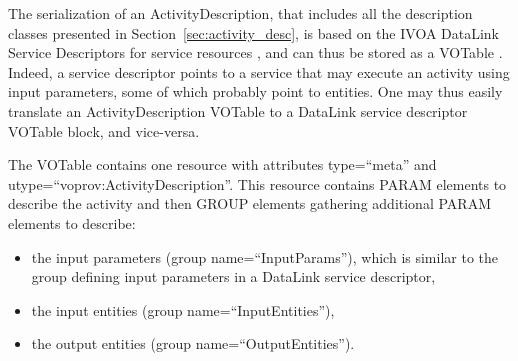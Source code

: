 


The serialization of an ActivityDescription, that includes all the description classes presented in Section~\ref{sec:activity_desc}, is based on the IVOA DataLink Service Descriptors for service resources \citep{std:Datalink}, and can thus be stored as a VOTable \citep{std:VOTABLE}. Indeed, a service descriptor points to a service that may execute an activity using input parameters, some of which probably point to entities. One may thus easily translate an ActivityDescription VOTable to a DataLink service descriptor VOTable block, and vice-versa.

The VOTable contains one resource with attributes type=``meta'' and utype=``voprov:ActivityDescription''. This resource contains PARAM elements to describe the activity and then GROUP elements gathering additional PARAM elements to describe:
\begin{itemize}
 \item the input parameters (group name=``InputParams''), which is similar to the group defining input parameters in a DataLink service descriptor,
 \item the input entities (group name=``InputEntities''),
 \item the output entities (group name=``OutputEntities''). 
 \end{itemize}
 

